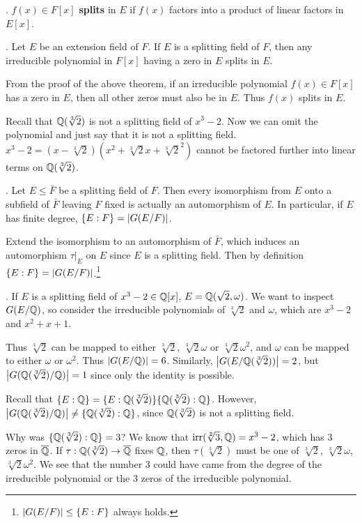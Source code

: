 . \(f(x) \in F[x]\) \textbf{splits} in \(E\) if \(f(x)\) factors into a product of linear factors in \(E[x]\).

\cor. Let \(E\) be an extension field of \(F\). If \(E\) is a splitting field of \(F\), then any irreducible polynomial in \(F[x]\) having a zero in \(E\) splits in \(E\).

\pf From the proof of the above theorem, if an irreducible polynomial \(f(x) \in F[x]\) has a zero in \(E\), then all other zeros must also be in \(E\). Thus \(f(x)\) splits in \(E\).

Recall that \(\mathbb{Q}(\sqrt[3]{2})\) is not a splitting field of \(x^3-2\). Now we can omit the polynomial and just say that it is not a splitting field. \(x^3 - 2 = (x - \sqrt[3]{2})(x^2 + \sqrt[3]{2}x + \sqrt[3]{2}^2)\) cannot be factored further into linear terms on \(\mathbb{Q}(\sqrt[3]{2})\).

\cor. Let \(E \leq \bar{F}\) be a splitting field of \(F\). Then every isomorphism from \(E\) onto a subfield of \(\bar{F}\) leaving \(F\) fixed is actually an automorphism of \(E\). In particular, if \(E\) has finite degree, \(\{E : F\} = \left| G(E/F) \right|\).

\pf Extend the isomorphism to an automorphism of \(\bar{F}\), which induces an automorphism \(\tau|_E\) on \(E\) since \(E\) is a splitting field. Then by definition \(\{E : F\} = \left| G(E/F) \right|\).\footnote{\(\left| G(E/F) \right| \leq \{E : F\}\) always holds.}

\ex. If \(E\) is a splitting field of \(x^3 - 2 \in \mathbb{Q}[x]\), \(E = \mathbb{Q}(\sqrt{2}, \omega)\). We want to inspect \(G(E/\mathbb{Q})\), so consider the irreducible polynomials of \(\sqrt[3]{2}\) and \(\omega\), which are \(x^3 - 2\) and \(x^2 + x + 1\).

Thus \(\sqrt[3]{2}\) can be mapped to either \(\sqrt[3]{2}\), \(\sqrt[3]{2}\omega\) or \(\sqrt[3]{2}\omega^2\), and \(\omega\) can be mapped to either \(\omega\) or \(\omega^2\). Thus \(\left| G(E/\mathbb{Q}) \right| = 6\). Similarly, \(\left| G(E/\mathbb{Q}(\sqrt[3]{2})) \right| = 2\), but \(\left| G(\mathbb{Q}(\sqrt[3]{2})/\mathbb{Q}) \right| = 1\) since only the identity is possible.

Recall that \(\{E : \mathbb{Q}\} = \{E : \mathbb{Q}(\sqrt[3]{2})\} \{\mathbb{Q}(\sqrt[3]{2}) : \mathbb{Q}\}\). However, \(\left| G(\mathbb{Q}(\sqrt[3]{2})/\mathbb{Q}) \right| \neq \{\mathbb{Q}(\sqrt[3]{2}) : \mathbb{Q}\}\), since \(\mathbb{Q}(\sqrt[3]{2})\) is not a splitting field.

\rmk Why was \(\{\mathbb{Q}(\sqrt[3]{2}) : \mathbb{Q}\} = 3\)? We know that \(\mathrm{irr}(\sqrt[2]{3}, \mathbb{Q}) = x^3 - 2\), which has \(3\) zeros in \(\bar{\Q}\). If \(\tau : \Q(\sqrt[3]{2}) \ra \bar{\Q}\) fixes \(\mathbb{Q}\), then \(\tau(\sqrt[3]{2})\) must be one of \(\sqrt[3]{2}\), \(\sqrt[3]{2}\omega\), \(\sqrt[3]{2}\omega^2\). We see that the number \(3\) could have came from the degree of the irreducible polynomial or the \(3\) zeros of the irreducible polynomial.

